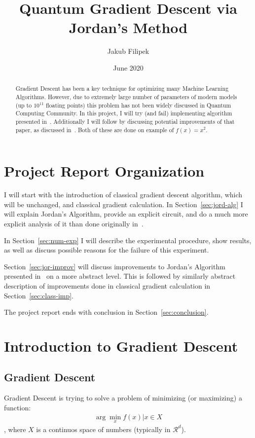 \documentclass{article}
\title{Quantum Gradient Descent via Jordan's Method}
\author{Jakub Filipek}
\date{June 2020}
\begin{document}
\maketitle

\begin{abstract}
    \noindent Gradient Descent has been a key technique for optimizing many Machine Learning Algorithms.
    However, due to extremely large number of parameters of modern models (up to $10^{11}$ floating points)
    this problem has not been widely discussed in Quantum Computing Community.
    In this project, I will try (and fail) implementing algorithm presented in~\cite{Jordan_2005}.
    Additionally I will follow by discussing potential improvements of that paper, as discussed in~\cite{Gily_n_2019}.
    Both of these are done on example of $f(x) = x^2$.
\end{abstract}

\section{Project Report Organization}
I will start with the introduction of classical gradient descent algorithm, which will be unchanged,
and classical gradient calculation. In Section~\ref{sec:jord-alg} I will explain Jordan's Algorithm,
provide an explicit circuit, and do a much more explicit analysis of it than done originally in~\cite{Jordan_2005}.

In Section~\ref{sec:num-exp} I will describe the experimental procedure, show results, as well as discuss possible reasons
for the failure of this experiment.

Section~\ref{sec:jor-improv} will discuss improvements to Jordan's Algorithm presented in~\cite{Gily_n_2019} on a more abstract level.
This is followed by similarly abstract description of improvements done in classical gradient calculation in Section~\ref{sec:class-imp}.

The project report ends with conclusion in Section~\ref{sec:conclusion}.

\section{Introduction to Gradient Descent}
\label{sec:intro-grad-desc}

\subsection{Gradient Descent}
\label{subsec:grad-desc}
Gradient Descent is trying to solve a problem of minimizing (or maximizing) a function:
\begin{align}
    \arg \min \limits_x f(x) | x \in X
\end{align}, where $X$ is a continuos space of numbers (typically in $\mathcal{R}^d$).
\end{document}
